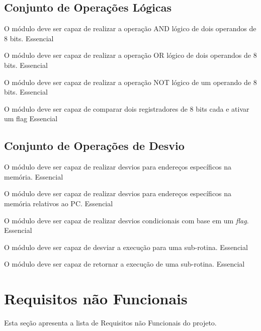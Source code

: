 \documentclass{article}
\begin{document}
  \subsection{Conjunto de Operações Lógicas} 
  
    \begin{functional}
      {O módulo deve ser capaz de realizar a operação AND lógico de dois operandos de 8 bits.}
      {Essencial}

      {O módulo deve ser capaz de realizar a operação OR lógico de dois operandos de 8 bits.}
      {Essencial}  
      
      {O módulo deve ser capaz de realizar a operação NOT lógico de um operando de 8 bits.}
      {Essencial}   
      
      {O módulo deve ser capaz de comparar dois registradores de 8 bits cada e ativar um flag}
      {Essencial}
    \end{functional}  
    
    \subsection{Conjunto de Operações de Desvio}
	    
	  \begin{functional}
		{O módulo deve ser capaz de realizar desvios para endereços específicos na memória.}
		{Essencial} 
		 
		 {O módulo deve ser capaz de realizar desvios para endereços específicos na memória relativos ao PC.}
		 {Essencial}
		 
		 {O módulo deve ser capaz de realizar desvios condicionais com base em um \textit{flag}.}
		 {Essencial}
		 
		 {O módulo deve ser capaz de desviar a execução para uma sub-rotina.}
		 {Essencial}
		 
		 {O módulo deve ser capaz de retornar a execução de uma sub-rotina.}
		 {Essencial}
	  \end{functional}

  \section{Requisitos não Funcionais}
  Esta seção apresenta a lista de Requisitos não Funcionais do projeto.
\end{document}
